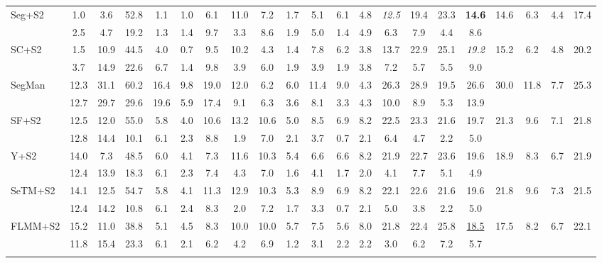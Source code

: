 \documentclass[preprint,12pt]{elsarticle}
\begin{document}
\begin{table}[!htb]
\begin{tabular}{lcccccccccccccccccccc}
Seg+S2 & 1.0 & 3.6 & 52.8 & 1.1 & 1.0 & 6.1 & 11.0 & 7.2 & 1.7 & 5.1 & 6.1 & 4.8 & \textit{12.5} & 19.4 & 23.3 & \textbf{14.6} & 14.6 & 6.3 & 4.4 & 17.4 \\
  & 2.5 & 4.7 & 19.2 & 1.3 & 1.4 & 9.7 & 3.3 & 8.6 & 1.9 & 5.0 & 1.4 & 4.9 & 6.3 & 7.9 & 4.4 & 8.6 &  &  &  &  \\ \addlinespace[2pt]
\rowcolor{gray!12}
SC+S2 & 1.5 & 10.9 & 44.5 & 4.0 & 0.7 & 9.5 & 10.2 & 4.3 & 1.4 & 7.8 & 6.2 & 3.8 & 13.7 & 22.9 & 25.1 & \textit{19.2} & 15.2 & 6.2 & 4.8 & 20.2 \\
  & 3.7 & 14.9 & 22.6 & 6.7 & 1.4 & 9.8 & 3.9 & 6.0 & 1.9 & 3.9 & 1.9 & 3.8 & 7.2 & 5.7 & 5.5 & 9.0 &  &  &  &  \\ \addlinespace[2pt]
SegMan & 12.3 & 31.1 & 60.2 & 16.4 & 9.8 & 19.0 & 12.0 & 6.2 & 6.0 & 11.4 & 9.0 & 4.3 & 26.3 & 28.9 & 19.5 & 26.6 & 30.0 & 11.8 & 7.7 & 25.3 \\
  & 12.7 & 29.7 & 29.6 & 19.6 & 5.9 & 17.4 & 9.1 & 6.3 & 3.6 & 8.1 & 3.3 & 4.3 & 10.0 & 8.9 & 5.3 & 13.9 &  &  &  &  \\ \addlinespace[2pt]
\rowcolor{gray!12}
SF+S2 & 12.5 & 12.0 & 55.0 & 5.8 & 4.0 & 10.6 & 13.2 & 10.6 & 5.0 & 8.5 & 6.9 & 8.2 & 22.5 & 23.3 & 21.6 & 19.7 & 21.3 & 9.6 & 7.1 & 21.8 \\
  & 12.8 & 14.4 & 10.1 & 6.1 & 2.3 & 8.8 & 1.9 & 7.0 & 2.1 & 3.7 & 0.7 & 2.1 & 6.4 & 4.7 & 2.2 & 5.0 &  &  &  &  \\ \addlinespace[2pt]
Y+S2 & 14.0 & 7.3 & 48.5 & 6.0 & 4.1 & 7.3 & 11.6 & 10.3 & 5.4 & 6.6 & 6.6 & 8.2 & 21.9 & 22.7 & 23.6 & 19.6 & 18.9 & 8.3 & 6.7 & 21.9 \\
  & 12.4 & 13.9 & 18.3 & 6.1 & 2.3 & 7.4 & 4.3 & 7.0 & 1.6 & 4.1 & 1.7 & 2.0 & 4.1 & 7.7 & 5.1 & 4.9 &  &  &  &  \\ \addlinespace[2pt]
\rowcolor{gray!12}
SeTM+S2 & 14.1 & 12.5 & 54.7 & 5.8 & 4.1 & 11.3 & 12.9 & 10.3 & 5.3 & 8.9 & 6.9 & 8.2 & 22.1 & 22.6 & 21.6 & 19.6 & 21.8 & 9.6 & 7.3 & 21.5 \\
  & 12.4 & 14.2 & 10.8 & 6.1 & 2.4 & 8.3 & 2.0 & 7.2 & 1.7 & 3.3 & 0.7 & 2.1 & 5.0 & 3.8 & 2.2 & 5.0 &  &  &  &  \\ \addlinespace[2pt]
FLMM+S2 & 15.2 & 11.0 & 38.8 & 5.1 & 4.5 & 8.3 & 10.0 & 10.0 & 5.7 & 7.5 & 5.6 & 8.0 & 21.8 & 22.4 & 25.8 & \uline{18.5} & 17.5 & 8.2 & 6.7 & 22.1 \\
  & 11.8 & 15.4 & 23.3 & 6.1 & 2.1 & 6.2 & 4.2 & 6.9 & 1.2 & 3.1 & 2.2 & 2.2 & 3.0 & 6.2 & 7.2 & 5.7 &  &  &  &  \\ \addlinespace[2pt]
\rowcolor{gray!12}

\end{tabular}
\end{table}
\end{document}
